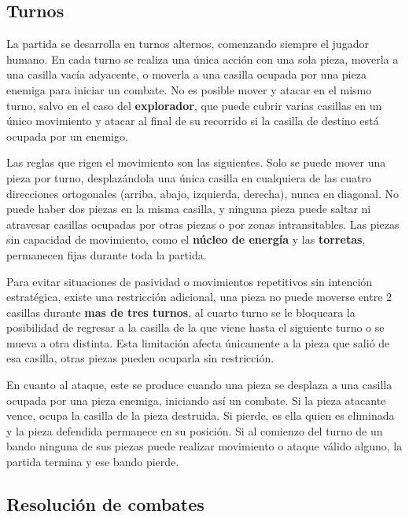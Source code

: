 \clearpage

\subsection{Turnos}

La partida se desarrolla en turnos alternos, comenzando siempre el jugador humano. En cada turno se realiza una única acción con una sola pieza, moverla a una casilla vacía adyacente, o moverla a una casilla ocupada por una pieza enemiga para iniciar un combate. No es posible mover y atacar en el mismo turno, salvo en el caso del \textbf{explorador}, que puede cubrir varias casillas en un único movimiento y atacar al final de su recorrido si la casilla de destino está ocupada por un enemigo.

Las reglas que rigen el movimiento son las siguientes. Solo se puede mover una pieza por turno, desplazándola una única casilla en cualquiera de las cuatro direcciones ortogonales (arriba, abajo, izquierda, derecha), nunca en diagonal. No puede haber dos piezas en la misma casilla, y ninguna pieza puede saltar ni atravesar casillas ocupadas por otras piezas o por zonas intransitables. Las  piezas sin capacidad de movimiento, como el \textbf{núcleo de energía} y las \textbf{torretas}, permanecen fijas durante toda la partida.

Para evitar situaciones de pasividad o movimientos repetitivos sin intención estratégica, existe una restricción adicional, una pieza no puede moverse entre 2 casillas durante \textbf{mas de tres turnos}, al cuarto turno se le bloqueara la posibilidad de regresar a la casilla de la que viene hasta el siguiente turno o se mueva a otra distinta. Esta limitación afecta únicamente a la pieza 
que salió de esa casilla, otras piezas pueden ocuparla sin restricción.

En cuanto al ataque, este se produce cuando una pieza se desplaza a una casilla ocupada por una pieza enemiga, iniciando así un combate. Si la pieza atacante vence, ocupa la casilla de la pieza destruida. Si pierde, es ella quien es eliminada y la pieza defendida permanece en su posición. Si al comienzo del turno de un bando ninguna de sus piezas puede realizar movimiento o ataque válido alguno, la partida termina y ese bando pierde.

\subsection{Resolución de combates}


